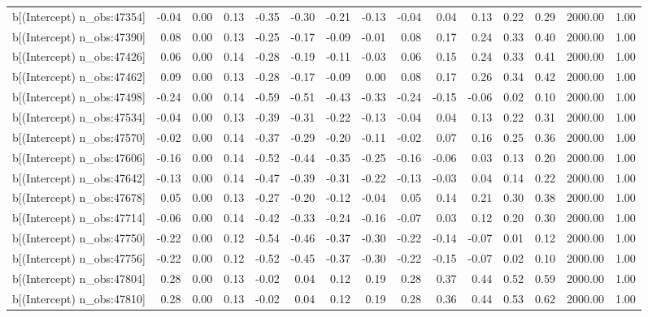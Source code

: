 \begin{table}[ht]
\begin{tabular}{rrrrrrrrrrrrrrr}
  b[(Intercept) n\_obs:47354] & -0.04 & 0.00 & 0.13 & -0.35 & -0.30 & -0.21 & -0.13 & -0.04 & 0.04 & 0.13 & 0.22 & 0.29 & 2000.00 & 1.00 \\ 
  b[(Intercept) n\_obs:47390] & 0.08 & 0.00 & 0.13 & -0.25 & -0.17 & -0.09 & -0.01 & 0.08 & 0.17 & 0.24 & 0.33 & 0.40 & 2000.00 & 1.00 \\ 
  b[(Intercept) n\_obs:47426] & 0.06 & 0.00 & 0.14 & -0.28 & -0.19 & -0.11 & -0.03 & 0.06 & 0.15 & 0.24 & 0.33 & 0.41 & 2000.00 & 1.00 \\ 
  b[(Intercept) n\_obs:47462] & 0.09 & 0.00 & 0.13 & -0.28 & -0.17 & -0.09 & 0.00 & 0.08 & 0.17 & 0.26 & 0.34 & 0.42 & 2000.00 & 1.00 \\ 
  b[(Intercept) n\_obs:47498] & -0.24 & 0.00 & 0.14 & -0.59 & -0.51 & -0.43 & -0.33 & -0.24 & -0.15 & -0.06 & 0.02 & 0.10 & 2000.00 & 1.00 \\ 
  b[(Intercept) n\_obs:47534] & -0.04 & 0.00 & 0.13 & -0.39 & -0.31 & -0.22 & -0.13 & -0.04 & 0.04 & 0.13 & 0.22 & 0.31 & 2000.00 & 1.00 \\ 
  b[(Intercept) n\_obs:47570] & -0.02 & 0.00 & 0.14 & -0.37 & -0.29 & -0.20 & -0.11 & -0.02 & 0.07 & 0.16 & 0.25 & 0.36 & 2000.00 & 1.00 \\ 
  b[(Intercept) n\_obs:47606] & -0.16 & 0.00 & 0.14 & -0.52 & -0.44 & -0.35 & -0.25 & -0.16 & -0.06 & 0.03 & 0.13 & 0.20 & 2000.00 & 1.00 \\ 
  b[(Intercept) n\_obs:47642] & -0.13 & 0.00 & 0.14 & -0.47 & -0.39 & -0.31 & -0.22 & -0.13 & -0.03 & 0.04 & 0.14 & 0.22 & 2000.00 & 1.00 \\ 
  b[(Intercept) n\_obs:47678] & 0.05 & 0.00 & 0.13 & -0.27 & -0.20 & -0.12 & -0.04 & 0.05 & 0.14 & 0.21 & 0.30 & 0.38 & 2000.00 & 1.00 \\ 
  b[(Intercept) n\_obs:47714] & -0.06 & 0.00 & 0.14 & -0.42 & -0.33 & -0.24 & -0.16 & -0.07 & 0.03 & 0.12 & 0.20 & 0.30 & 2000.00 & 1.00 \\ 
  b[(Intercept) n\_obs:47750] & -0.22 & 0.00 & 0.12 & -0.54 & -0.46 & -0.37 & -0.30 & -0.22 & -0.14 & -0.07 & 0.01 & 0.12 & 2000.00 & 1.00 \\ 
  b[(Intercept) n\_obs:47756] & -0.22 & 0.00 & 0.12 & -0.52 & -0.45 & -0.37 & -0.30 & -0.22 & -0.15 & -0.07 & 0.02 & 0.10 & 2000.00 & 1.00 \\ 
  b[(Intercept) n\_obs:47804] & 0.28 & 0.00 & 0.13 & -0.02 & 0.04 & 0.12 & 0.19 & 0.28 & 0.37 & 0.44 & 0.52 & 0.59 & 2000.00 & 1.00 \\ 
  b[(Intercept) n\_obs:47810] & 0.28 & 0.00 & 0.13 & -0.02 & 0.04 & 0.12 & 0.19 & 0.28 & 0.36 & 0.44 & 0.53 & 0.62 & 2000.00 & 1.00 \\ 

\end{tabular}
\end{table}
